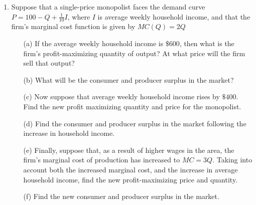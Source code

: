 \documentclass[11pt]{article}
\begin{document}
\begin{enumerate}
  \item Suppose that a single-price monopolist faces the demand curve $P = 100 - Q + \frac{1}{10} I$, where $I$ is average weekly household income, and that the firm's marginal cost function is given by $MC(Q) = 2Q$

  \begin{enumerate}
    \item[(a)] If the average weekly household income is $\$ 600$, then what is the firm's profit-maximizing quantity of output? At what price will the firm sell that output?

    \item[(b)] What will be the consumer and producer surplus in the market?

    \item[(c)] Now suppose that average weekly household income rises by $\$ 400$. Find the new profit maximizing quantity and price for the monopolist.

    \item[(d)] Find the consumer and producer surplus in the market following the increase in household income.

    \item[(e)] Finally, suppose that, as a result of higher wages in the area, the firm's marginal cost of production has increased to $MC = 3Q$. Taking into account both the increased marginal cost, and the increase in average household income, find the new profit-maximizing price and quantity.

    \item[(f)] Find the new consumer and producer surplus in the market. 
  \end{enumerate}
\end{enumerate}
\end{document}
